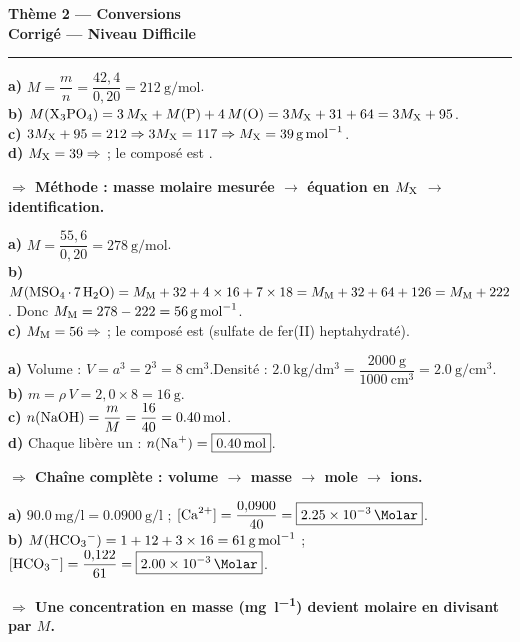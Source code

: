 \documentclass[11pt,a4paper]{article}
\newcommand{\rep}[1]{\par\smallskip\noindent\textbf{\color{corrcol}$\Rightarrow$ #1}}
\begin{document}
\begin{center}
{\LARGE\bfseries\color{primarydark}Thème 2 — Conversions}\\[1pt]
{\large\color{corrcol}\textbf{Corrigé — Niveau Difficile}}\\
{\color{primary}\rule{0.6\linewidth}{1pt}}
\end{center}

\begin{cor}
\textbf{a)} $M=\dfrac{m}{n}=\dfrac{42{,}4}{0{,}20}=\SI{212}{\gram\per\mole}$.\\
\textbf{b)} $M(\ce{X3PO4})=3\,M_{\ce{X}} + M(\ce{P}) + 4\,M(\ce{O}) = 3M_{\ce{X}} + 31 + 64 = 3M_{\ce{X}} + 95$.\\
\textbf{c)} $3M_{\ce{X}} + 95 = 212 \Rightarrow 3M_{\ce{X}} = 117 \Rightarrow M_{\ce{X}} = \SI{39}{\gram\per\mole}$.\\
\textbf{d)} $M_{\ce{X}}=39 \Rightarrow$  ; le composé est .
\rep{Méthode : masse molaire mesurée $\to$ équation en $M_{\ce{X}}$ $\to$ identification.}
\end{cor}

\begin{cor}
\textbf{a)} $M=\dfrac{55{,}6}{0{,}20}=\SI{278}{\gram\per\mole}$.\\
\textbf{b)} $M(\ce{MSO4.7H2O})=M_{\ce{M}} + 32 + 4\times16 + 7\times18 = M_{\ce{M}} + 32 + 64 + 126 = M_{\ce{M}} + 222$.
Donc $M_{\ce{M}} = 278 - 222 = \SI{56}{\gram\per\mole}$.\\
\textbf{c)} $M_{\ce{M}}=56 \Rightarrow$  ; le composé est 
(sulfate de fer(II) heptahydraté).
\end{cor}

\begin{cor}
\textbf{a)} Volume : $V=a^3=2^3=\SI{8}{\centi\meter\cubed}$.\quad Densité :
$\SI{2,0}{\kilo\gram\per\deci\meter\cubed} = \dfrac{\SI{2000}{\gram}}{\SI{1000}{\centi\meter\cubed}} = \SI{2,0}{\gram\per\centi\meter\cubed}$.\\
\textbf{b)} $m=\rho\,V = 2{,}0\times8 = \SI{16}{\gram}$.\\
\textbf{c)} $n(\ce{NaOH})=\dfrac{m}{M}=\dfrac{16}{40}=\SI{0,40}{\mole}$.\\
\textbf{d)} Chaque  libère un  : $n(\ce{Na+})=\boxed{\SI{0,40}{\mole}}$.
\rep{Chaîne complète : volume $\to$ masse $\to$ mole $\to$ ions.}
\end{cor}

\begin{cor}
\textbf{a)} $\SI{90,0}{\milli\gram\per\litre}=\SI{0,0900}{\gram\per\litre}$ ;
$[\ce{Ca^2+}]=\dfrac{0{,}0900}{40}=\boxed{\SI{2,25e-3}{\Molar}}$.\\
\textbf{b)} $M(\ce{HCO3-})=1+12+3\times16=\SI{61}{\gram\per\mole}$ ;
$[\ce{HCO3-}]=\dfrac{0{,}122}{61}=\boxed{\SI{2,00e-3}{\Molar}}$.
\rep{Une concentration en masse (\si{\milli\gram\per\litre}) devient molaire en divisant par $M$.}
\end{cor}
\end{document}
